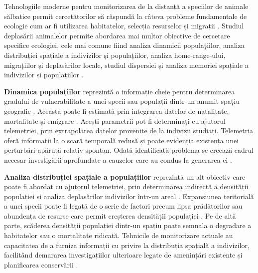 \documentclass[11pt,onehalfspacing]{elife}
\begin{document}
Tehnologiile moderne pentru monitorizarea de la distanță a speciilor de animale sălbatice permit cercetătorilor să răspundă la câteva probleme fundamentale de ecologie cum ar fi utilizarea habitatelor, selecția resurselor și migrații \citep{wilmers_nickel_bryce_smith_wheat_yovovich_2015}. Studiul deplasării animalelor permite abordarea mai multor obiective de cercetare specifice ecologiei, cele mai comune fiind analiza dinamicii populațiilor, analiza distribuției spațiale a indivizilor și populațiilor, analiza home-range-ului, migrațiilor și deplasărilor locale, studiul dispersiei și analiza memoriei spațiale a indivizilor și populațiilor \citep{Hooten2017}.

\textbf{Dinamica populațiilor} reprezintă o informație cheie pentru determinarea gradului de vulnerabilitate a unei specii sau populații dintr-un anumit spațiu geografic \citep{Hooten2017}. Aceasta poate fi estimată prin  integrarea datelor de natalitate, mortalitate și emigrare \citep{begon_harper_townsend_2006}. Acești parametrii pot fi determinați cu ajutorul telemetriei, prin extrapolarea datelor provenite de la indivizii studiați. Telemetria oferă informații la o scară temporală redusă și poate evidenția existența unei perturbări apărută relativ spontan. Odată identificată problema se creează cadrul necesar investigării aprofundate a cauzelor care au condus la generarea ei \citep{gaillard_festa-bianchet_yoccoz_1998, bowler_benton_2005}.

\textbf{Analiza distribuției spațiale a populațiilor} reprezintă un alt obiectiv care poate fi abordat cu ajutorul telemetriei, prin determinarea indirectă a densității populației și analiza deplasărilor indivizilor într-un areal \citep{Hooten2017}. Expansiunea teritorială a unei specii poate fi legată de o serie de factori precum lipsa prădătorilor sau abundența de resurse care permit creșterea densității populației \citep{blondel_chessel_frochot_1988, mitani_watts_amsler_2010, christensen_radford_2018}. Pe de altă parte, scăderea densității populației dintr-un spațiu poate semnala o degradare a habitatelor sau o mortalitate ridicată. Tehnicile de monitorizare actuale au capacitatea de a furniza informații cu privire la distribuția spațială a indivizilor, facilitând demararea investigațiilor ulterioare legate de amenințări existente și planificarea conservării \citep{guisan_thuiller_2005}.
\end{document}
